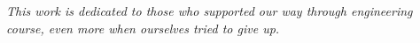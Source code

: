 \begin{dedication}
   \vspace*{\fill}
   \centering
   \noindent
   \textit{ This work is dedicated to those who supported our way through
   engineering course, even more when ourselves tried to give up. } \vspace*{\fill}
\end{dedication}

